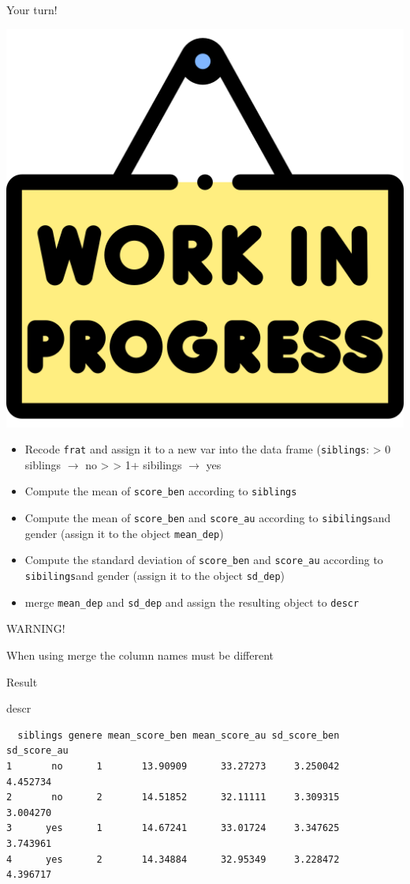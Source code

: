 \documentclass[
  ignorenonframetext,
]{beamer}
\newenvironment{Shaded}{\begin{snugshade}}{\end{snugshade}}
\newcommand{\NormalTok}[1]{\textcolor[rgb]{0.12,0.11,0.11}{#1}}
\begin{document}
\begin{frame}[fragile]{Your turn!}
\protect\hypertarget{your-turn}{}
\begin{center}\includegraphics[width=0.15\linewidth]{img/work} \end{center}

\small

\begin{itemize}
\item
  Recode \texttt{frat} and assign it to a new var into the data frame
  (\texttt{siblings}: \textgreater{} 0 siblings \(\rightarrow\) no
  \textgreater{} \textgreater{} 1+ sibilings \(\rightarrow\) yes
\item
  Compute the mean of \texttt{score\_ben} according to \texttt{siblings}
\item
  Compute the mean of \texttt{score\_ben} and \texttt{score\_au}
  according to \texttt{sibilings}and gender (assign it to the object
  \texttt{mean\_dep})
\item
  Compute the standard deviation of \texttt{score\_ben} and
  \texttt{score\_au} according to \texttt{sibilings}and gender (assign
  it to the object \texttt{sd\_dep})
\item
  merge \texttt{mean\_dep} and \texttt{sd\_dep} and assign the resulting
  object to \texttt{descr}
\end{itemize}

\begin{alertblock}{WARNING!}

When using merge the column names must be different

\end{alertblock}
\end{frame}

\begin{frame}[fragile]{Result}
\protect\hypertarget{result}{}
\footnotesize

\begin{Shaded}
\begin{Highlighting}[]
\NormalTok{descr}
\end{Highlighting}
\end{Shaded}

\begin{verbatim}
  siblings genere mean_score_ben mean_score_au sd_score_ben sd_score_au
1       no      1       13.90909      33.27273     3.250042    4.452734
2       no      2       14.51852      32.11111     3.309315    3.004270
3      yes      1       14.67241      33.01724     3.347625    3.743961
4      yes      2       14.34884      32.95349     3.228472    4.396717
\end{verbatim}
\end{frame}
\end{document}
